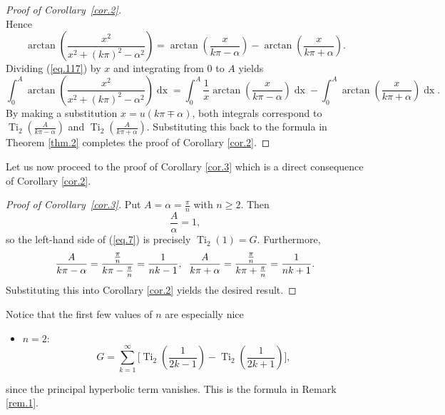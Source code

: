 \documentclass[preprint,12pt,nopreprintline]{elsarticle}
\begin{document}
\begin{proof}[Proof of Corollary~\ref{cor.2}]
\begin{equation}
\end{equation}
Hence
\begin{equation}\label{eq.117}
\operatorname{arctan}\left(\frac{x^2}{x^2+\left(k\pi\right)^2-\alpha^2}\right)=\operatorname{arctan}\left(\frac{x}{k\pi-\alpha}\right)-\operatorname{arctan}\left(\frac{x}{k\pi+\alpha}\right).
\end{equation}
Dividing (\ref{eq.117}) by $x$ and integrating from $0$ to $A$ yields
\begin{equation}
\int_0^A\operatorname{arctan}\left(\frac{x^2}{x^2+\left(k\pi\right)^2-\alpha^2}\right)\operatorname{dx}=\int_0^A\frac{1}{x}\operatorname{arctan}\left(\frac{x}{k\pi-\alpha}\right)\operatorname{dx}-\int_0^A\operatorname{arctan}\left(\frac{x}{k\pi+\alpha}\right)\operatorname{dx}.
\end{equation}
By making a substitution $x=u\left(k\pi\mp\alpha\right)$, both integrals correspond to $\operatorname{Ti}_2\left(\frac{A}{k\pi-\alpha}\right)$ and $\operatorname{Ti}_2\left(\frac{A}{k\pi+\alpha}\right)$. 
Substituting this back to the formula in Theorem \ref{thm.2} completes the proof of Corollary \ref{cor.2}.
\end{proof}

\newpage
Let us now proceed to the proof of Corollary \ref{cor.3} which is a direct consequence of Corollary \ref{cor.2}.

\begin{proof}[Proof of Corollary~\ref{cor.3}]\normalfont
Put $A=\alpha=\frac{\pi}{n}$ with $n\geq 2$. Then
\begin{equation}
\frac{A}{\alpha}=1,
\end{equation}
so the left-hand side of (\ref{eq.7}) is precisely $\operatorname{Ti}_2\left(1\right)=G$. Furthermore,
\begin{equation}
\frac{A}{k\pi-\alpha}=\frac{\frac{\pi}{n}}{k\pi-\frac{\pi}{n}}=\frac{1}{nk-1},\hspace{0.2cm}\frac{A}{k\pi+\alpha}=\frac{\frac{\pi}{n}}{k\pi+\frac{\pi}{n}}=\frac{1}{nk+1}.
\end{equation}
Substituting this into Corollary \ref{cor.2} yields the desired result.
\end{proof}

Notice that the first few values of $n$ are especially nice
\begin{itemize}
    \item $n=2$:
    \begin{equation}
    G=\sum_{k=1}^{\infty}\Bigg[\operatorname{Ti}_2\left(\frac{1}{2k-1}\right)-\operatorname{Ti}_2\left(\frac{1}{2k+1} \right) \Bigg],
    \end{equation}
\end{itemize}
since the principal hyperbolic term vanishes. This is the formula in Remark \ref{rem.1}.
\end{document}
